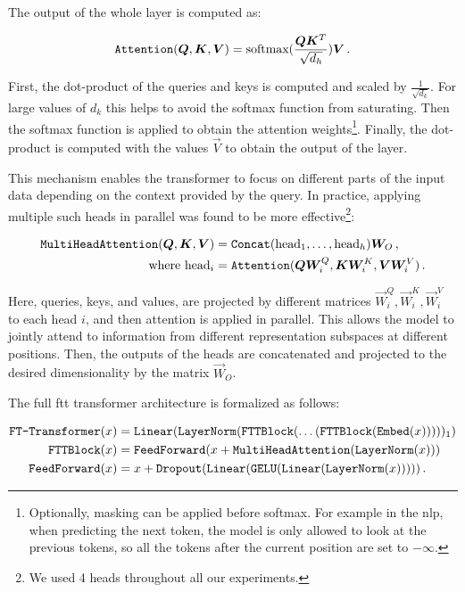 The output of the whole layer is computed as:

\begin{equation}
    \texttt{Attention}({{\boldsymbol{Q}}, {\boldsymbol{K}}, {\boldsymbol{V}}}) = \text{softmax}(\frac{{\boldsymbol{Q}}{\boldsymbol{K}}^T}{\sqrt{d_h}}) {\boldsymbol{V}} \,.
\end{equation}

First, the dot-product of the queries and keys is computed and scaled by $\frac{1}{\sqrt{d_k}}$. For large values of
$d_k$ this helps to avoid the softmax function from saturating. Then the softmax function is applied to obtain the
attention weights\footnote{Optionally, masking can be applied before softmax. For example in the \gls{nlp}, when
    predicting the next token, the model is only allowed to look at the previous tokens, so all the tokens after the current
    position are set to $-\infty$.}. Finally, the dot-product is computed with the values $\vec{V}$ to obtain the output of
the layer.

This mechanism enables the transformer to focus on different parts of the input data depending on the context provided
by the query. In practice, applying multiple such heads in parallel was found to be more effective\footnote{We used 4
    heads throughout all our experiments.}:

\begin{align}
    \texttt{MultiHeadAttention}({\boldsymbol{Q}}, {\boldsymbol{K}}, {\boldsymbol{V}}) & = \texttt{Concat}(\text{head}_1, \dots, \text{head}_h) {\boldsymbol{W}}_O \,,           \\
    \text{where head}_i             & = \texttt{Attention}({\boldsymbol{Q}} {\boldsymbol{W}}_i^Q, {\boldsymbol{K}} {\boldsymbol{W}}_i^K, {\boldsymbol{V}} {\boldsymbol{W}}_i^V)\,.
\end{align}

Here, queries, keys, and values, are projected by different matrices $\vec{W}_i^Q, \vec{W}_i^K, \vec{W}_i^V$ to each
head $i$, and then attention is applied in parallel. This allows the model to jointly attend to information from
different representation subspaces at different positions. Then, the outputs of the heads are concatenated and projected
to the desired dimensionality by the matrix $\vec{W}_O$.

The full \gls{ftt} transformer architecture is formalized as follows:

{\fontsize{11}{10}\selectfont
\begin{align}
    \label{eq:ftt}
    \texttt{FT-Transformer}(x)                 & = \texttt{Linear}(\texttt{LayerNorm}(\texttt{FTTBlock}(\dots(\texttt{FTTBlock}(\texttt{Embed}(x)))))_1) \\
    \texttt{FTTBlock}(x)            & = \texttt{FeedForward}(x + \texttt{MultiHeadAttention}(\texttt{LayerNorm}(x)))                 \\
    \texttt{FeedForward}(x) & = x + \texttt{Dropout}(\texttt{Linear}(\texttt{GELU}(\texttt{Linear}(\texttt{LayerNorm}(x))))) \,.
\end{align}
}

